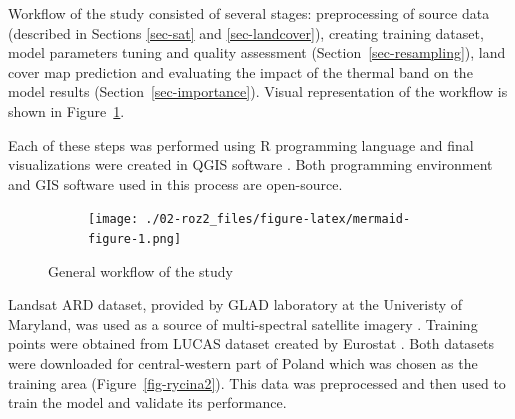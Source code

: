 \documentclass{amuthesis}
\begin{document}
Workflow of the study consisted of several stages: preprocessing of
source data (described in Sections \ref{sec-sat} and
\ref{sec-landcover}), creating training dataset, model parameters tuning
and quality assessment (Section~\ref{sec-resampling}), land cover map
prediction and evaluating the impact of the thermal band on the model
results (Section~\ref{sec-importance}). Visual representation of the
workflow is shown in Figure~\ref{fig-rycina1}.

Each of these steps was performed using R programming language
\autocite{R-base} and final visualizations were created in QGIS software
\autocite{qgis_development_team_qgis_2009}. Both programming environment
and GIS software used in this process are open-source.

\begin{figure}

{\centering 

\begin{figure}[H]

{\centering \texttt{[image: ./02-roz2\_files/figure-latex/mermaid-figure-1.png]}

}

\end{figure}

}

\caption{\label{fig-rycina1}General workflow of the study}

\end{figure}

Landsat ARD dataset, provided by GLAD laboratory at the Univeristy of
Maryland, was used as a source of multi-spectral satellite imagery
\autocite{potapov_landsat_2020}. Training points were obtained from
LUCAS dataset created by Eurostat \autocite{dandrimont_harmonised_2020}.
Both datasets were downloaded for central-western part of Poland which
was chosen as the training area (Figure~\ref{fig-rycina2}). This data
was preprocessed and then used to train the model and validate its
performance.
\end{document}
